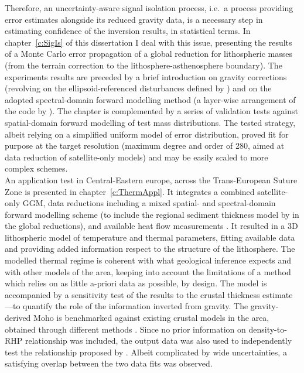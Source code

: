 Therefore, an uncertainty-aware signal isolation process, i.e.~a process providing error estimates alongside its reduced gravity data, is a necessary step in estimating confidence of the inversion results, in statistical terms.
In chapter~\ref{c:SigIs} of this dissertation I deal with this issue, presenting the results of a Monte Carlo error propagation \parencite{Aster2018} of a global reduction for lithospheric masses (from the terrain correction to the lithosphere-asthenosphere boundary).
The experiments results are preceded by a brief introduction on gravity corrections (revolving on the ellipsoid-referenced disturbances defined by \cite{Vajda2008}) and on the adopted spectral-domain forward modelling method (a layer-wise arrangement of the code by \cite{Wieczorek2018}).
The chapter is complemented by a series of validation tests against spatial-domain forward modelling of test mass distributions.
The tested strategy, albeit relying on a simplified uniform model of error distribution, proved fit for purpose at the target resolution (maximum degree and order of 280, aimed at data reduction of satellite-only models) and may be easily scaled to more complex schemes.
\\

An application test in Central-Eastern europe, across the Trans-European Suture Zone is presented in chapter~\ref{c:ThermAppl}.
It integrates a combined satellite-only GGM, data reductions including a mixed spatial- and spectral-domain forward modelling scheme (to include the regional sediment thickness model by \cite{Tesauro2008} in the global reductions), and available heat flow measurements \parencite{globalHF}.
It resulted in a 3D lithospheric model of temperature and thermal parameters, fitting available data and providing added information respect to the structure of the lithosphere.
The modelled thermal regime is coherent with what geological inference expects and with other models of the area, keeping into account the limitations of a method which relies on as little a-priori data as possible, by design.
The model is accompanied by a sensitivity test of the results to the crustal thickness estimate ---to quantify the role of the information inverted from gravity.
The gravity-derived Moho is benchmarked against existing crustal models in the area, obtained through different methods \parencites{Grad2009}{Pasyanos2014}{Reguzzoni2015}.
Since no prior information on density-to-RHP relationship was included, the output data was also used to independently test the relationship proposed by \textcite{Hasterok2017_ign}.
Albeit complicated by wide uncertainties, a satisfying overlap between the two data fits was observed.
\\

